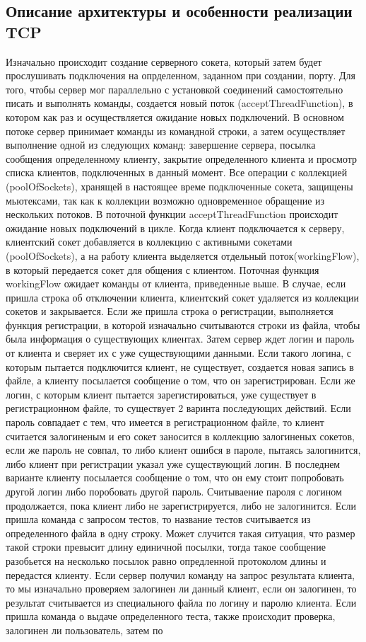 \subsection{Описание архитектуры и особенности реализации TCP}

Изначально происходит создание серверного сокета, который затем будет прослушивать подключения на опрделенном, заданном при создании, порту. Для того, чтобы сервер мог параллельно с установкой соединений самостоятельно писать и выполнять команды, создается новый поток (acceptThreadFunction), в котором как раз и осуществляется ожидание новых подключений. В основном потоке сервер принимает команды из командной строки, а затем осуществляет выполнение одной из следующих команд: завершение сервера, посылка сообщения определенному клиенту, закрытие определенного клиента и просмотр списка клиентов, подключенных в данный момент. Все операции с коллекцией (poolOfSockets), хранящей в настоящее време подключенные сокета, защищены мьютексами, так как к коллекции возможно одновременное обращение из нескольких потоков. В поточной функции acceptThreadFunction происходит ожидание новых подключений в цикле. Когда клиент подключается к серверу, клиентский сокет добавляется в коллекцию с активными сокетами (poolOfSockets), а на работу клиента выделяется отдельный поток(workingFlow), в который передается сокет для общения с клиентом. Поточная функция workingFlow ожидает команды от клиента, приведенные выше. В случае, если пришла строка об отключении клиента, клиентский сокет удаляется из коллекции сокетов и закрывается. Если же пришла строка о регистрации, выполняется функция регистрации, в которой изначально считываются строки из файла, чтобы была информация о существующих клиентах. Затем сервер ждет логин и пароль от клиента и сверяет их с уже существующими данными. Если такого логина, с которым пытается подключится клиент, не существует, создается новая запись в файле, а клиенту посылается сообщение о том, что он зарегистрирован. Если же логин, с которым клиент пытается зарегистироваться, уже существует в регистрационном файле, то существует 2 варинта последующих действий. Если пароль совпадает с тем, что имеется в регистрационном файле, то клиент считается залогиненым и его сокет заносится в коллекцию залогиненых сокетов, если же пароль не совпал, то либо клиент ошибся в пароле, пытаясь залогинится, либо клиент при регистрации указал уже существующий логин. В последнем варианте клиенту посылается сообщение о том, что он ему стоит попробовать другой логин либо поробовать другой пароль. Считываение пароля с логином продолжается, пока клиент либо не зарегистрируется, либо не залогинится. Если пришла команда с запросом тестов, то название тестов считывается из определенного файла в одну строку. Может случится такая ситуация, что размер такой строки превысит длину единичной посылки, тогда такое сообщение разобьется на несколько посылок равно опредленной протоколом длины и передастся клиенту. Если сервер получил команду на запрос результата клиента, то мы изначально проверяем залогинен ли данный клиент, если он залогинен, то результат считывается из специального файла по логину и паролю клиента. Если пришла команда о выдаче определенного теста, также происходит проверка, залогинен ли пользователь, затем по 
